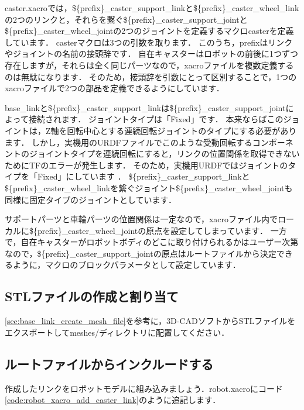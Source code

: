 \documentclass[{../../master}]{subfiles}
\begin{document}
\textsf{caster.xacro}では，\textsf{\$\{prefix\}\_caster\_support\_link}と\textsf{\$\{prefix\}\_caster\_wheel\_link}の2つのリンクと，それらを繋ぐ\textsf{\$\{prefix\}\_caster\_support\_joint}と\textsf{\$\{prefix\}\_caster\_wheel\_joint}の2つのジョイントを定義するマクロ\textsf{caster}を定義しています．
\textsf{caster}マクロは3つの引数を取ります．
このうち，\textsf{prefix}はリンクやジョイントの名前の接頭辞です．
自在キャスターはロボットの前後に1つずつ存在しますが，それらは全く同じパーツなので，xacroファイルを複数定義するのは無駄になります．
そのため，接頭辞を引数にとって区別することで，1つのxacroファイルで2つの部品を定義できるようにしています．

\textsf{base\_link}と\textsf{\$\{prefix\}\_caster\_support\_link}は\textsf{\$\{prefix\}\_caster\_support\_joint}によって接続されます．
ジョイントタイプは「Fixed」です．
本来ならばこのジョイントは，Z軸を回転中心とする連続回転ジョイントのタイプにする必要があります．
しかし，実機用のURDFファイルでこのような受動回転するコンポーネントのジョイントタイプを連続回転にすると，リンクの位置関係を取得できないためにTFのエラーが発生します．
そのため，実機用URDFではジョイントのタイプを「Fixed」にしています
．
\textsf{\$\{prefix\}\_caster\_support\_link}と\textsf{\$\{prefix\}\_caster\_wheel\_link}を繋ぐジョイント\textsf{\$\{prefix\}\_caster\_wheel\_joint}も同様に固定タイプのジョイントとしています．

サポートパーツと車輪パーツの位置関係は一定なので，xacroファイル内でローカルに\textsf{\$\{prefix\}\_caster\_wheel\_joint}の原点を設定してしまっています．
一方で，自在キャスターがロボットボディのどこに取り付けられるかはユーザー次第なので，\textsf{\$\{prefix\}\_caster\_support\_joint}の原点はルートファイルから決定できるように，マクロのブロックパラメータとして設定しています．

\subsection{STLファイルの作成と割り当て}

\ref{sec:base_link_create_mesh_file}を参考に，3D-CADソフトからSTLファイルをエクスポートして\textsf{meshes/}ディレクトリに配置してください．

\subsection{ルートファイルからインクルードする}

作成したリンクをロボットモデルに組み込みましょう．\textsf{robot.xacro}にコード\ref{code:robot_xacro_add_caster_link}のように追記します．
\end{document}
